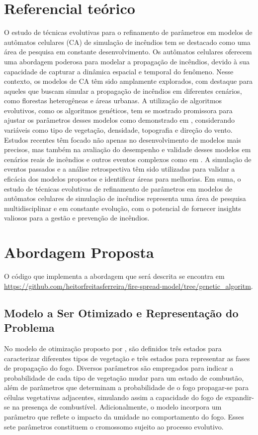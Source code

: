 \documentclass[12pt]{article}
\begin{document}
\section{Referencial teórico} \label{sec:firstpage}
O estudo de técnicas evolutivas para o refinamento de parâmetros em modelos de autômatos celulares (CA) de simulação de incêndios tem se destacado como uma área de pesquisa em constante desenvolvimento. Os autômatos celulares oferecem uma abordagem poderosa para modelar a propagação de incêndios, devido à sua capacidade de capturar a dinâmica espacial e temporal do fenômeno.
Nesse contexto, os modelos de CA têm sido amplamente explorados, com destaque para aqueles que buscam simular a propagação de incêndios em diferentes cenários, como florestas heterogêneas e áreas urbanas. A utilização de algoritmos evolutivos, como os algoritmos genéticos, tem se mostrado promissora para ajustar os parâmetros desses modelos como demonstrado em \cite{shan2008genetic}, considerando variáveis como tipo de vegetação, densidade, topografia e direção do vento.
Estudos recentes têm focado não apenas no desenvolvimento de modelos mais precisos, mas também na avaliação do desempenho e validade desses modelos em cenários reais de incêndios e outros eventos complexos como em \cite{dias2018calibrating}. A simulação de eventos passados e a análise retrospectiva têm sido utilizadas para validar a eficácia dos modelos propostos e identificar áreas para melhorias.
Em suma, o estudo de técnicas evolutivas de refinamento de parâmetros em modelos de autômatos celulares de simulação de incêndios representa uma área de pesquisa multidisciplinar e em constante evolução, com o potencial de fornecer insights valiosos para a gestão e prevenção de incêndios.

\section{Abordagem Proposta}
O código que implementa a abordagem que será descrita se encontra em \url {https://github.com/heitorfreitasferreira/fire-spread-model/tree/genetic_algoritm}.
\subsection{Modelo a Ser Otimizado e Representação do Problema}
No modelo de otimização proposto por \cite{ferreira2023stochastic}, são definidos três estados para caracterizar diferentes tipos de vegetação e três estados para representar as fases de propagação do fogo. Diversos parâmetros são empregados para indicar a probabilidade de cada tipo de vegetação mudar para um estado de combustão, além de parâmetros que determinam a probabilidade de o fogo propagar-se para células vegetativas adjacentes, simulando assim a capacidade do fogo de expandir-se na presença de combustível. Adicionalmente, o modelo incorpora um parâmetro que reflete o impacto da umidade no comportamento do fogo. Esses sete parâmetros constituem o cromossomo sujeito ao processo evolutivo.
\end{document}
